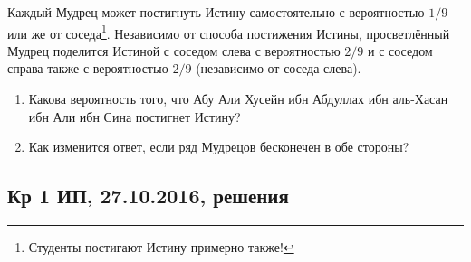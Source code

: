 \begin{enumerate}
Каждый Мудрец может постигнуть Истину самостоятельно с вероятностью $1/9$ или же от соседа\footnote{Студенты постигают Истину примерно также!}. Независимо от способа постижения Истины, просветлённый Мудрец поделится Истиной с соседом слева с вероятностью $2/9$ и с соседом справа также с вероятностью $2/9$ (независимо от соседа слева).


\begin{enumerate}
\item Какова вероятность того, что Абу Али Хусейн ибн Абдуллах ибн аль-Хасан ибн Али ибн Сина постигнет Истину?
\item Как изменится ответ, если ряд Мудрецов бесконечен в обе стороны?
\end{enumerate}

\end{enumerate}

\subsection{Кр 1 ИП, 27.10.2016, решения}

